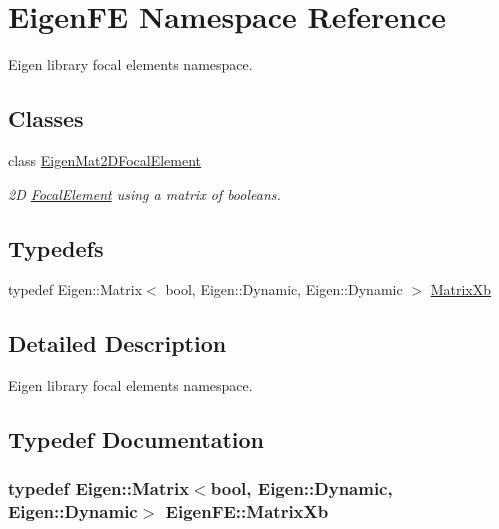 \hypertarget{namespaceEigenFE}{}\section{Eigen\+FE Namespace Reference}
\label{namespaceEigenFE}


Eigen library focal elements\textquotesingle{} namespace.  


\subsection*{Classes}
\begin{DoxyCompactItemize}
\item 
class \hyperlink{classEigenFE_1_1EigenMat2DFocalElement}{Eigen\+Mat2\+D\+Focal\+Element}
\begin{DoxyCompactList}\small\item\em 2D \hyperlink{classFocalElement}{Focal\+Element} using a matrix of booleans. \end{DoxyCompactList}\end{DoxyCompactItemize}
\subsection*{Typedefs}
\begin{DoxyCompactItemize}
\item 
typedef Eigen\+::\+Matrix$<$ bool, Eigen\+::\+Dynamic, Eigen\+::\+Dynamic $>$ \hyperlink{namespaceEigenFE_a478c1c0c93aef88b798e7c38a9c65d59}{Matrix\+Xb}
\end{DoxyCompactItemize}


\subsection{Detailed Description}
Eigen library focal elements\textquotesingle{} namespace. 

\subsection{Typedef Documentation}
\subsubsection[{\texorpdfstring{Matrix\+Xb}{MatrixXb}}]{\setlength{\rightskip}{0pt plus 5cm}typedef Eigen\+::\+Matrix$<$bool, Eigen\+::\+Dynamic, Eigen\+::\+Dynamic$>$ {\bf Eigen\+F\+E\+::\+Matrix\+Xb}}\hypertarget{namespaceEigenFE_a478c1c0c93aef88b798e7c38a9c65d59}{}\label{namespaceEigenFE_a478c1c0c93aef88b798e7c38a9c65d59}
